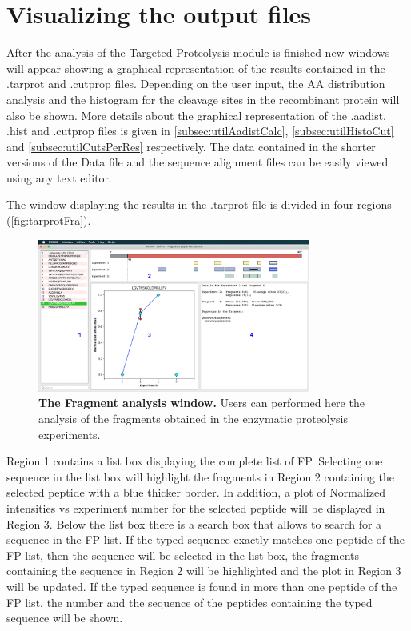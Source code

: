 \section{Visualizing the output files}

After the analysis of the Targeted Proteolysis module is finished new windows will appear showing a graphical representation of the results contained in the .tarprot and .cutprop files. Depending on the user input, the AA distribution analysis and the histogram for the cleavage sites in the recombinant protein will also be shown. More details about the graphical representation of the .aadist, .hist and .cutprop files is given in \autoref{subsec:utilAadistCalc}, \autoref{subsec:utilHistoCut} and \autoref{subsec:utilCutsPerRes} respectively. The data contained in the shorter versions of the Data file and the sequence alignment files can be easily viewed using any text editor.   

The window displaying the results in the .tarprot file is divided in four regions (\autoref{fig:tarprotFra}).

\begin{figure}[h]
	\centering
	\includegraphics[width=0.8\textwidth]{./IMAGES/MOD-TARPROT/tarprot-frag.jpg}	    
	\caption[The Fragment analysis window]{\textbf{The Fragment analysis window.} Users can performed here the analysis of the fragments obtained in the enzymatic proteolysis experiments.} 
	\label{fig:tarprotFra}
	\vspace{-5pt} 	
\end{figure} 

Region \num{1} contains a list box displaying the complete list of FP. Selecting one sequence in the list box will highlight the fragments in Region \num{2} containing the selected peptide with a blue thicker border. In addition, a plot of Normalized intensities vs experiment number for the selected peptide will be displayed in Region \num{3}. Below the list box there is a search box that allows to search for a sequence in the FP list. If the typed sequence exactly matches one peptide of the FP list, then the sequence will be selected in the list box, the fragments containing the sequence in Region \num{2} will be highlighted and the plot in Region \num{3} will be updated. If the typed sequence is found in more than one peptide of the FP list, the number and the sequence of the peptides containing the typed sequence will be shown.

